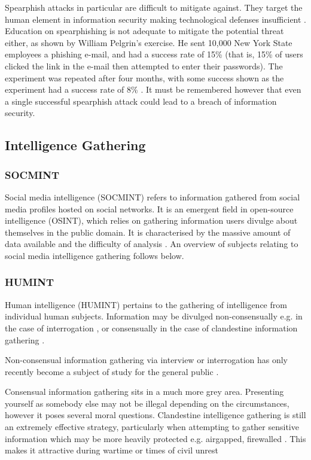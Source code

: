 \documentclass{article}
\begin{document}
Spearphish attacks in particular are difficult to mitigate against. They target the human element in information security making technological defenses insufficient \citep{spearphishing}. Education on spearphishing is not adequate to mitigate the potential threat either, as shown by William Pelgrin's exercise. He sent 10,000 New York State employees a phishing e-mail, and had a success rate of 15\% (that is, 15\% of users clicked the link in the e-mail then attempted to enter their passwords). The experiment was repeated after four months, with some success shown as the experiment had a success rate of 8\% \citep{spearphishingresults}. It must be remembered however that even a single successful spearphish attack could lead to a breach of information security.

\subsection{Intelligence Gathering}
\subsubsection{SOCMINT}
Social media intelligence (SOCMINT) refers to information gathered from social media profiles hosted on social networks. It is an emergent field in open-source intelligence (OSINT), which relies on gathering information users divulge about themselves in the public domain. It is characterised by the massive amount of data available \citep{socmintoverview} and the difficulty of analysis \citep{socmintlitreview}. An overview of subjects relating to social media intelligence gathering follows below.

\subsubsection{HUMINT}
Human intelligence (HUMINT) pertains to the gathering of intelligence from individual human subjects. Information may be divulged non-consensually e.g. in the case of interrogation \citep{criminalvshumint}, or consensually in the case of clandestine information gathering \citep{clandestinehumint}. 

Non-consensual information gathering via interview or interrogation has only recently become a subject of study for the general public \citep{humintinterrogators}. 

Consensual information gathering sits in a much more grey area. Presenting yourself as somebody else may not be illegal depending on the circumstances, however it poses several moral questions. Clandestine intelligence gathering is still an extremely effective strategy, particularly when attempting to gather sensitive information which may be more heavily protected e.g. airgapped, firewalled \citep{clandestinehumint}. This makes it attractive during wartime or times of civil unrest \citep{humintni}\citep{humintcyberage}
\end{document}
